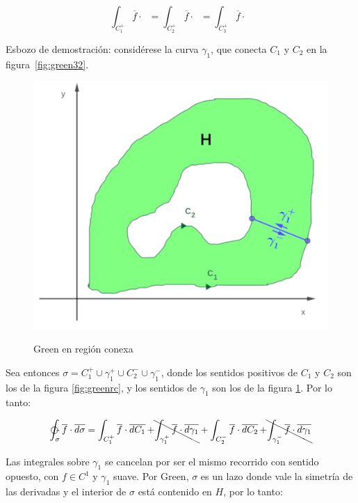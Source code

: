 \documentclass{article}
\begin{document}
\begin{enumerate}
\begin{equation}
\int_{C_1^+} \overline{f} \cdot \mathop{\overline{dC_1}} = \int_{C_2^+} \overline{f} \cdot \mathop{\overline{dC_2}} = \int_{C_3^+} \overline{f} \cdot \mathop{\overline{dC_3}}
\end{equation}

Esbozo de demostración: considérese la curva $\gamma_1$, que conecta $C_1$ y $C_2$ en la figura~\ref{fig:green32}.

\begin{figure}[ht]
\centering
\caption{Green en región conexa}
\includegraphics[scale=1]{img/teoremas/green_rc_demo.png}
\label{fig:greendemo}
\end{figure}

Sea entonces $\sigma = C_1^+ \cup \gamma_1^+ \cup C_2^- \cup \gamma_1^-$, donde los sentidos positivos de $C_1$ y $C_2$ son los de la figura \ref{fig:greenrc}, y los sentidos de $\gamma_1$ son los de la figura \ref{fig:greendemo}. Por lo tanto:

\begin{equation}
\ointctrclockwise_{\sigma} \overline{f} \cdot \mathop{\overline{d\sigma}} = \int_{C_1^+} \overline{f} \cdot \mathop{\overline{dC_1}} + \bcancel{ \int_{\gamma_1^+} \overline{f} \cdot \mathop{\overline{d\gamma_1}} } + \int_{C_2^-} \overline{f} \cdot \mathop{\overline{dC_2}} + \bcancel{ \int_{\gamma_1^-} \overline{f} \cdot \mathop{\overline{d\gamma_1}} }
\end{equation}

Las integrales sobre $\gamma_1$ se cancelan por ser el mismo recorrido con sentido opuesto, con $f \in C^1$ y $\gamma_1$ suave. Por Green, $\sigma$ es un lazo donde vale la simetría de las derivadas y el interior de $\sigma$ está contenido en $H$, por lo tanto:


\end{enumerate}
\end{document}
